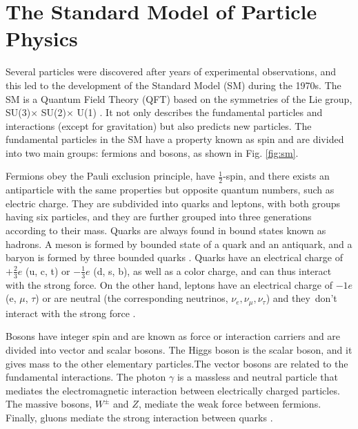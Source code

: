 \chapter{\leavevmode\newline The Standard Model of Particle Physics}
\label{chap:chapter_1}
Several particles were discovered after years of experimental observations, and this led to the development of the Standard Model (SM) during the 1970s. The SM is a Quantum Field Theory (QFT) based on the symmetries of the Lie group, SU(3)$ \times$ SU(2)$ \times$ U(1) \cite{stiller2016full}. It not only describes the fundamental particles and interactions (except for gravitation) but also predicts new particles. The fundamental particles in the SM have a property known as spin and are divided into two main groups: fermions and bosons, as shown in Fig. \ref{fig:sm}.

Fermions obey the Pauli exclusion principle, have $\frac{1}{2}$-spin, and there exists an antiparticle with the same properties but opposite quantum numbers, such as electric charge. They are subdivided into quarks and leptons, with both groups having six particles, and they are further grouped into three generations according to their mass. Quarks are always found in bound states known as hadrons. A meson is formed by bounded state of a quark and an antiquark, and a baryon is formed by three bounded quarks \cite{stiller2016full, fedi2016studies, grummer2021search}. Quarks have an electrical charge of $+\frac{2}{3}e$ (u, c, t) or $-\frac{1}{3}e$ (d, s, b), as well as a color charge, and can thus interact with the strong force. On the other hand, leptons have an electrical charge of $-1e$ (e, $\mu$, $\tau$) or are neutral (the corresponding neutrinos, $\nu_e, \nu_\mu, \nu_\tau$) and they don't interact with the strong force \cite{bonanomi2021response, bragagnolo2021measurement}.

Bosons have integer spin and are known as force or interaction carriers and are divided into vector and scalar bosons. The Higgs boson is the scalar boson, and it gives mass to the other elementary particles.The vector bosons are related to the fundamental interactions. The photon $\gamma$ is a massless and neutral particle that mediates the electromagnetic interaction between electrically charged particles. The massive bosons, $W^{\pm}$ and $Z$, mediate the weak force between fermions. Finally, gluons mediate the strong interaction between quarks \cite{grummer2021search, bragagnolo2021measurement}.

